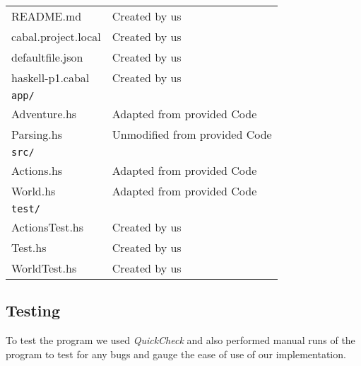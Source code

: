 \documentclass[a4paper,]{article}
\begin{document}
\begin{tabular}{@{}l@{\hspace{20pt}}p{}}
README.md & Created by us \\
cabal.project.local & Created by us \\
defaultfile.json & Created by us \\
haskell-p1.cabal & Created by us \\
\texttt{app/} \\
\quad Adventure.hs & Adapted from provided Code \\
\quad Parsing.hs & Unmodified from provided Code \\
\texttt{src/} \\
\quad Actions.hs & Adapted from provided Code \\
\quad World.hs & Adapted from provided Code \\
\texttt{test/} \\
\quad ActionsTest.hs & Created by us \\
\quad Test.hs & Created by us \\
\quad WorldTest.hs & Created by us \\
\end{tabular}


\newpage

\hypertarget{testing}{%
\subsection{Testing}\label{testing}}

To test the program we used \textit{QuickCheck} and also performed manual runs of the program to test for any bugs and gauge the ease of use of our implementation.
\end{document}
